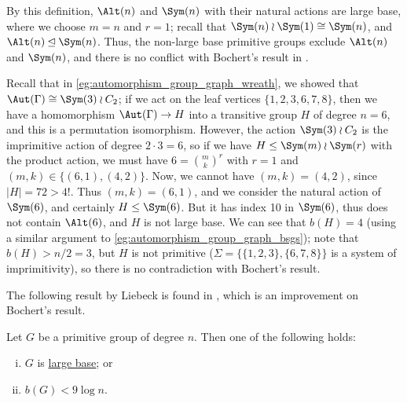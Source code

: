 By this definition, $\Alt(n)$ and $\Sym(n)$ with their natural actions are large base, where we choose $m = n$ and $r = 1$; recall that $\Sym(n) \wr \Sym(1) \cong \Sym(n)$, and $\Alt(n) \unlhd \Sym(n)$. Thus, the non-large base primitive groups exclude $\Alt(n)$ and $\Sym(n)$, and there is no conflict with Bochert's result in \cite{bochert1889}.

\begin{example}\label{eg:automorphism_group_graph_large_base}
    Recall that in \autoref{eg:automorphism_group_graph_wreath}, we showed that $\Aut(\Gamma) \cong \Sym(3) \wr C_2$; if we act on the leaf vertices $\{1,2,3,6,7,8\}$, then we have a homomorphism $\Aut(\Gamma) \to H$ into a transitive group $H$ of degree $n=6$, and this is a permutation isomorphism. However, the action $\Sym(3) \wr C_2$ is the imprimitive action of degree $2 \cdot 3 = 6$, so if we have $H \leq \Sym(m) \wr \Sym(r)$ with the product action, we must have $6 = \binom{m}{k}^r$ with $r = 1$ and $(m,k) \in \{(6,1),(4,2)\}$. Now, we cannot have $(m,k) = (4,2)$, since $|H| = 72 > 4!$. Thus $(m,k) = (6,1)$, and we consider the natural action of $\Sym(6)$, and certainly $H \leq \Sym(6)$. But it has index 10 in $\Sym(6)$, thus does not contain $\Alt(6)$, and $H$ is not large base. We can see that $b(H) = 4$ (using a similar argument to \autoref{eg:automorphism_group_graph_bsgs}); note that $b(H) > n/2 = 3$, but $H$ is not primitive ($\Sigma = \{\{1,2,3\},\{6,7,8\}\}$ is a system of imprimitivity), so there is no contradiction with Bochert's result.
\end{example}

The following result by Liebeck is found in \cite{liebeck1984}, which is an improvement on Bochert's result.

\begin{theorem}[Liebeck, 1984]\label{thm:liebeck1984}
    Let $G$ be a primitive group of degree $n$. Then one of the following holds:
    \begin{enumerate}[(i)]
        \item $G$ is \hyperref[def:large_base]{large base}; or
        \item $b(G) < 9\log n$.
    \end{enumerate}
\end{theorem}

